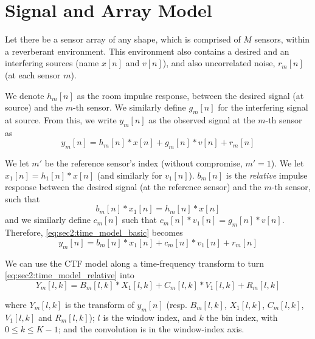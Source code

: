 \section{Signal and Array Model}
\label{sec:signal_model}

Let there be a sensor array of any shape, which is comprised of $M$ sensors, within a reverberant environment. This environment also contains a desired and an interfering sources (name $x[n]$ and $v[n]$), and also uncorrelated noise, $r_m[n]$ (at each sensor $m$).

We denote $h_m[n]$ as the room impulse response, between the desired signal (at source) and the $m$-th sensor. We similarly define $g_m[n]$ for the interfering signal at source. From this, we write $y_m[n]$ as the observed signal at the $m$-th sensor as
\begin{equation}
	\label{eq:sec2:time_model_basic}
	y_m[n] = h_m[n] \ast x[n] + g_m[n] \ast v[n] + r_m[n]
\end{equation}

We let $m'$ be the reference sensor's index (without compromise, $m' = 1$). We let $x_1[n] = h_1[n] \ast x[n]$ (and similarly for $v_1[n]$). $b_m[n]$ is the \textit{relative} impulse response between the desired signal (at the reference sensor) and the $m$-th sensor, such that
\begin{equation}
	b_m[n] \ast x_1[n] = h_m[n] \ast x[n]
\end{equation}
and we similarly define $c_m[n]$ such that $c_m[n] \ast v_1[n] = g_m[n] \ast v[n]$. Therefore, \cref{eq:sec2:time_model_basic} becomes
\begin{equation}
	\label{eq:sec2:time_model_relative}
	y_m[n] = b_m[n] \ast x_1[n] + c_m[n] \ast v_1[n] + r_m[n]
\end{equation}

We can use the CTF model \cite{ctf_model} along a time-frequency transform to turn \cref{eq:sec2:time_model_relative} into
\begin{equation}
	\label{eq:sec2:time-freq_model_conv}
	Y_m[l,k] = B_m[l,k] \ast X_1[l,k] + C_m[l,k] \ast V_1[l,k] + R_m[l,k]
\end{equation}

where $Y_m[l,k]$ is the transform of $y_m[n]$ (resp. $B_m[l,k]$, $X_1[l,k]$, $C_m[l,k]$, $V_1[l,k]$ and $R_m[l,k]$); $l$ is the window index, and $k$ the bin index, with $0 \leq k \leq K-1$; and the convolution is in the window-index axis.

